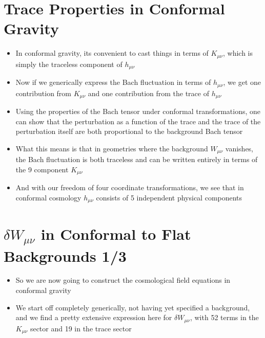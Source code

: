 \documentclass[10pt,letterpaper]{article}
\numberwithin{equation}{section}
\begin{document}
\section{Trace Properties in Conformal Gravity}
\begin{itemize}
	\item In conformal gravity, its convenient to cast things in terms of $K_{\mu\nu}$, which is simply the traceless component of $h_{\mu\nu}$
	\item Now if we generically express the Bach fluctuation in terms of $h_{\mu\nu}$, we get one contribution from $K_{\mu\nu}$ and one contribution from the trace of $h_{\mu\nu}$
	\item Using the properties of the Bach tensor under conformal transformations, one can show that the perturbation as a function of the trace and the trace of the perturbation itself are both proportional to the background Bach tensor
	\item What this means is that in geometries where the background $W_{\mu\nu}$ vanishes, the Bach fluctuation is both traceless and can be written entirely in terms of the 9 component $K_{\mu\nu}$
	\item And with our freedom of four coordinate transformations, we see that in conformal cosmology $h_{\mu\nu}$ consists of 5 independent physical components
\end{itemize}


\section{$\delta W_{\mu\nu}$ in Conformal to Flat Backgrounds 1/3}
\begin{itemize}
	\item So we are now going to construct the cosmological field equations in conformal gravity
	\item We start off completely generically, not having yet specified a background, and we find a pretty extensive expression here for $\delta W_{\mu\nu}$, with 52 terms in the $K_{\mu\nu}$ sector and 19 in the trace sector
\end{itemize}

\end{document}
